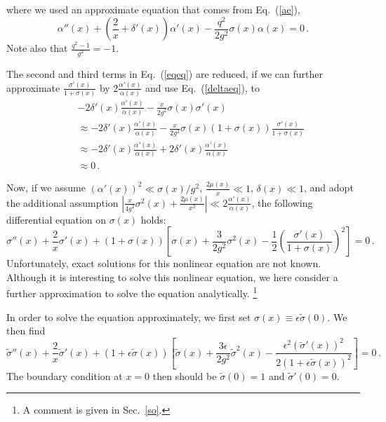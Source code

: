\documentclass[
aps,prd,
12pt,%
nopreprintnumbers,
showpacs,
eqsecnum,
nofootinbib
]{revtex4-1}
\begin{document}
where we used an approximate equation that comes from Eq.~(\ref{ae}),
\begin{equation}
\alpha''(x)+\left(\frac{2}{x}+\delta'(x)\right)\alpha'(x)-\frac{q^2}{2g^2}
\sigma(x)\alpha(x)=0\,.
\label{eqe}
\end{equation}
Note also that $\frac{q^2-1}{g^2}=-1$.

The second and third terms in Eq.~(\ref{eqeq}) are reduced, if we can
further approximate
$\frac{\sigma'(x)}{1+\sigma(x)}$ by $2\frac{\alpha'(x)}{\alpha(x)}$ and use
Eq.~(\ref{deltaeq}), to
\begin{eqnarray}
& &-2\delta'(x)\frac{\alpha'(x)}{\alpha(x)}-
\frac{x}{2g^2}\sigma(x)\sigma'(x)\nonumber \\
& &\approx
-2\delta'(x)\frac{\alpha'(x)}{\alpha(x)}-
\frac{x}{2g^2}\sigma(x)(1+\sigma(x))\frac{\sigma'(x)}{1+\sigma(x)}\nonumber \\
& &\approx
-2\delta'(x)\frac{\alpha'(x)}{\alpha(x)}
+2\delta'(x)\frac{\alpha'(x)}{\alpha(x)}\nonumber
\\ & &\approx 
0\,.
\label{eqf}
\end{eqnarray}

Now, if we assume $(\alpha'(x))^2\ll\sigma(x)/g^2$,
$\frac{2\mu(x)}{x}\ll 1$, 
$\delta(x)\ll 1$, and adopt the
additional assumption $|\frac{x}{4g^2}\sigma^2(x)+\frac{2\mu(x)}{x^2}|\ll
2\frac{\alpha'(x)}{\alpha(x)}$, the following differential equation on
$\sigma(x)$ holds:
\begin{equation}
\sigma''(x)+\frac{2}{x}\sigma'(x)+(1+\sigma(x))
\left[\sigma(x)+\frac{3}{2g^2}\sigma^2(x)-\frac{1}{2}
\left(
\frac{\sigma'(x)}{1+\sigma(x)}\right)^2\right]=0\,.
\end{equation}
Unfortunately, exact solutions for this nonlinear equation are not known.
Although it is interesting to solve this nonlinear equation, 
we here consider a further approximation to solve the equation analytically.%
\footnote{A comment is given in Sec.~\ref{so}.}

In order to solve the equation approximately, we first set
$\sigma(x)\equiv\epsilon\tilde{\sigma}(0)$. We then find
\begin{equation}
\tilde{\sigma}''(x)+\frac{2}{x}\tilde{\sigma}'(x)+(1+\epsilon\tilde{\sigma}(x))
\left[\tilde{\sigma}(x)+\frac{3\epsilon}{2g^2}\tilde{\sigma}^2(x)-
\frac{\epsilon^2(\tilde{\sigma}'(x))^2}{2\left(1+\epsilon\tilde{\sigma}(x)\right)^2}
\right]=0\,.
\label{req1}
\end{equation}
The boundary condition at $x=0$ then should be
$\tilde{\sigma}(0)=1$ and $\tilde{\sigma}'(0)=0$.
\end{document}
